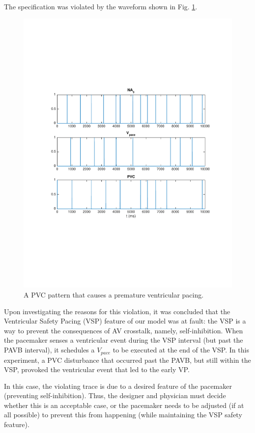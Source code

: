 The specification was violated by the waveform shown in Fig. \ref{fig:bug8_kept1}.
\begin{figure}[tb]
\centering
\includegraphics[width=0.7\linewidth]{figures/bug8_kept1}
\caption{A PVC pattern that causes a premature ventricular pacing.}
\label{fig:bug8_kept1}
\end{figure}
Upon investigating the reasons for this violation, it was concluded that the Ventricular Safety Pacing (VSP) feature of our model was at fault: the VSP is a way to prevent the consequences of AV crosstalk, namely, self-inhibition. 
When the pacemaker senses a ventricular event during the VSP interval (but past the PAVB interval), it schedules a $V_{pace}$ to be executed at the end of the VSP.
In this experiment, a PVC disturbance that occurred past the PAVB, but still within the VSP, provoked the ventricular event that led to the early VP.

In this case, the violating trace is due to a desired feature of the pacemaker (preventing self-inhibition).
Thus, the designer and physician must decide whether this is an acceptable case, or the pacemaker needs to be adjusted (if at all possible) to prevent this from happening (while maintaining the VSP safety feature).

